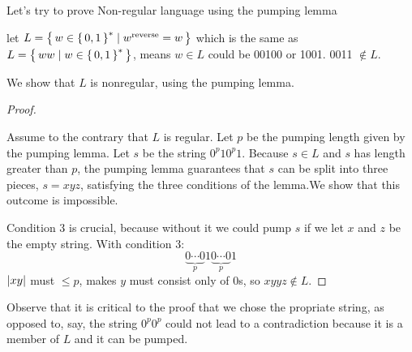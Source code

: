 

Let's try to prove Non-regular language using the pumping lemma
\begin{example}
    let
    $
        L = { \left\{\, w \in { \left\{\,0,1\,\right\} }^* \mid w^{\text{reverse}} = w \,\right\} }
    $
    which is the same as
    $
        L = { \left\{\, ww \mid w \in { \left\{\,0,1\,\right\} }^* \,\right\} }
    $,
    means $w \in L$ could be 00100 or 1001. 0011 $\notin L$. 

    We show that $L$ is nonregular, using the pumping lemma.

    \begin{proof} \

        Assume to the contrary that $L$ is regular. Let $p$ be the pumping length given by
        the pumping lemma. Let $s$ be the string $0^p10^p1$. Because $s \in L$ and $s$ has
        length greater than $p$, the pumping lemma guarantees that $s$ can be split into
        three pieces, $s = xyz$, satisfying the three conditions of the lemma.We show that
        this outcome is impossible.

        Condition 3 is crucial, because without it we could pump $s$ if we let $x$ and $z$
        be the empty string. With condition 3: 
        \[
            \underbrace{0 \cdots 0}_p 1 \underbrace{0 \cdots 0}_p 1
        \]
        ${ \left\lvert xy \right\rvert }$ must $\le p$, makes $y$ must consist only of 0s, so $xyyz \not \in L$.
    \end{proof}

        Observe that it is critical to the proof that we chose the propriate string, as
        opposed to, say, the string $0^p0^p$ could not lead to a contradiction because it
        is a member of $L$ and it can be pumped.
\end{example}

